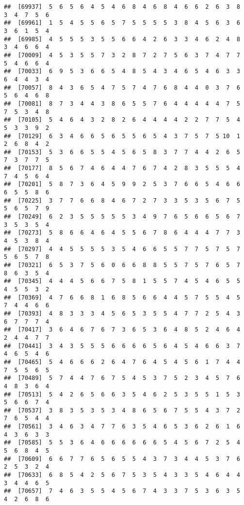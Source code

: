 \documentclass[
]{book}
\begin{document}
\begin{verbatim}
##  [69937]  5  6  5  6  4  5  4  6  8  4  6  8  4  6  6  2  6  3  8  3  4  7  5  6
##  [69961]  1  5  4  5  5  6  5  7  5  5  5  5  3  8  4  5  6  3  6  3  6  1  5  4
##  [69985]  4  5  5  5  3  5  5  6  6  4  2  6  3  3  4  6  2  4  8  3  4  6  6  4
##  [70009]  4  5  3  5  5  7  3  2  8  7  2  7  5  6  3  7  4  7  7  5  4  6  6  4
##  [70033]  6  9  5  3  6  6  5  4  8  5  4  3  4  6  5  4  6  3  3  6  4  4  3  4
##  [70057]  8  4  3  6  5  4  7  5  7  4  7  6  8  4  4  0  3  7  6  5  6  4  6  8
##  [70081]  8  7  3  4  4  3  8  6  5  5  7  6  4  4  4  4  4  7  5  7  5  3  4  8
##  [70105]  5  4  6  4  3  2  8  2  6  4  4  4  4  2  2  7  7  5  4  5  3  3  9  2
##  [70129]  6  3  4  6  6  5  6  5  5  6  5  4  3  7  5  7  5 10  1  2  6  8  4  2
##  [70153]  5  3  6  6  5  5  4  5  6  5  8  3  7  7  4  4  2  6  5  7  3  7  7  5
##  [70177]  8  5  6  7  4  6  4  4  7  6  7  4  2  8  3  5  5  5  4  7  4  5  6  4
##  [70201]  5  8  7  3  6  4  5  9  9  2  5  3  7  6  6  5  4  6  6  6  5  5  8  6
##  [70225]  3  7  7  6  6  8  4  6  7  2  7  3  3  5  3  5  6  7  5  5  6  5  7  9
##  [70249]  6  2  3  5  5  5  5  5  3  4  9  7  6  5  6  6  5  6  7  3  5  3  5  4
##  [70273]  5  8  6  6  4  6  4  5  5  6  7  8  6  4  4  4  7  7  3  4  5  3  8  4
##  [70297]  4  4  5  5  5  5  3  5  4  6  6  5  5  7  7  5  7  5  7  5  6  5  7  8
##  [70321]  6  5  3  7  5  6  0  6  6  8  8  5  5  7  5  7  6  5  7  8  6  3  5  4
##  [70345]  4  4  4  5  6  6  7  5  8  1  5  5  7  4  5  4  6  5  5  4  5  5  3  2
##  [70369]  4  7  6  6  8  1  6  8  5  6  6  4  4  5  7  5  5  4  5  7  4  4  6  6
##  [70393]  4  8  3  3  3  4  5  6  5  3  5  5  4  7  7  2  5  4  3  6  7  7  7  4
##  [70417]  3  6  4  6  7  6  7  3  6  5  3  6  4  8  5  2  4  6  4  2  4  4  7  7
##  [70441]  3  4  3  5  5  5  6  6  6  6  5  6  4  5  4  6  6  3  7  4  6  5  4  6
##  [70465]  5  4  6  6  6  2  6  4  7  6  4  5  4  5  6  1  7  4  4  7  5  5  6  5
##  [70489]  5  7  4  4  7  6  7  5  4  5  3  7  5  2  3  4  5  7  6  4  8  3  6  4
##  [70513]  5  4  2  6  5  6  6  3  5  4  6  2  5  3  5  5  1  5  3  5  6  6  7  4
##  [70537]  3  8  3  5  3  5  3  4  8  6  5  6  7  5  5  4  3  7  2  7  6  5  4  4
##  [70561]  3  4  6  3  4  7  7  6  3  5  4  6  5  3  6  2  6  1  6  4  3  6  3  3
##  [70585]  5  5  3  6  4  6  6  6  6  6  6  5  4  5  6  7  2  5  4  5  6  8  4  5
##  [70609]  6  6  7  7  6  5  6  5  5  4  3  7  3  4  4  5  3  7  6  2  5  3  2  4
##  [70633]  6  8  5  4  2  5  6  7  5  3  5  4  3  3  5  4  6  4  4  3  4  4  6  5
##  [70657]  7  4  6  3  5  5  4  5  6  7  4  3  3  7  5  3  6  3  5  4  2  6  8  6

\end{verbatim}
\end{document}
